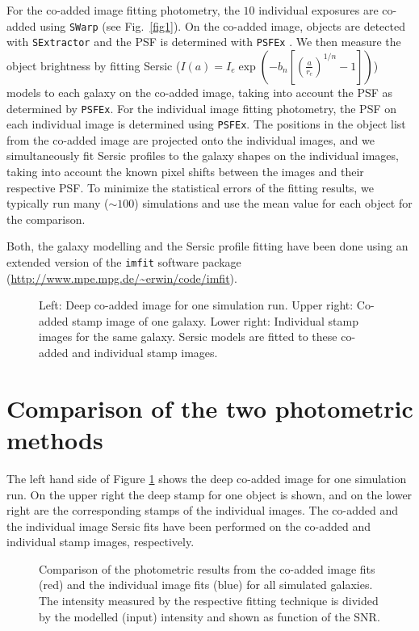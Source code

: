 \documentclass[11pt,twoside]{article}
\begin{document}
For the co-added image
fitting photometry, the $10$ individual exposures are co-added using {\tt SWarp}
(see Fig.\ \ref{fig1}). On the co-added image,
objects are detected with {\tt SExtractor} and the PSF is determined
with {\tt PSFEx} \citep{2011ASPC..442..435B}.
We then measure the object brightness by fitting
Sersic ($I(a) = I_e \exp(-b_n[(\frac{a}{r_e})^{1/n}-1])$)
models to each galaxy on the co-added image, taking into account the PSF as determined
by {\tt PSFEx}.
For the individual image fitting photometry, the PSF on each individual image is determined using
{\tt PSFEx}. The positions in the object list from the co-added image are projected onto the
individual images, and we simultaneously fit Sersic profiles to the galaxy shapes on the individual images,
taking into account the known pixel shifts between the images and their respective PSF.
To minimize the statistical errors of the fitting results, we typically run many ($\sim100$)
simulations and use the mean value for each object for the comparison.

Both, the galaxy modelling and the Sersic profile fitting have been done using an extended
version of the {\tt imfit} software
package (\url{http://www.mpe.mpg.de/~erwin/code/imfit}).
%
\begin{figure}[t]
\caption{Left: Deep co-added image for one simulation run. Upper right: Co-added stamp image
of one galaxy. Lower right: Individual stamp images for the same galaxy. Sersic models are fitted
to these co-added and individual stamp images.}
\label{fig2}
\end{figure}
%
\section{Comparison of the two photometric methods}
The left hand side of Figure \ref{fig2} shows the deep co-added image for one simulation run.
On the upper right the deep stamp for one object is shown, and on the lower right
are the corresponding stamps of the individual images. The co-added and the individual
image Sersic fits have been performed on the co-added and individual stamp images, respectively.
%
\begin{figure}[t]
\caption{Comparison of the photometric results from the co-added image fits (red) and the
individual image fits (blue) for all simulated galaxies. The intensity measured by the respective
fitting technique is divided by the modelled (input) intensity and shown as function of the
SNR.}
\label{fig3}
\end{figure}
%
\end{document}
